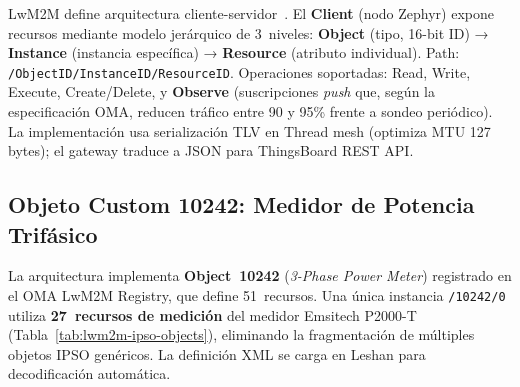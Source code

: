 LwM2M define arquitectura cliente-servidor~\cite{OMA_LwM2M2020}. El \textbf{Client} (nodo Zephyr) expone recursos mediante modelo jerárquico de 3~niveles: \textbf{Object} (tipo, 16-bit ID) → \textbf{Instance} (instancia específica) → \textbf{Resource} (atributo individual). Path: \texttt{/ObjectID/InstanceID/ResourceID}. Operaciones soportadas: Read, Write, Execute, Create/Delete, y \textbf{Observe} (suscripciones \emph{push} que, según la especificación OMA, reducen tráfico entre 90 y 95\% frente a sondeo periódico). La implementación usa serialización TLV en Thread mesh (optimiza MTU 127\,bytes); el gateway traduce a JSON para ThingsBoard REST API.

\subsection{Objeto Custom 10242: Medidor de Potencia Trifásico}
\label{sec:nodo-lwm2m-objetos}

La arquitectura implementa \textbf{Object~10242} (\emph{3-Phase Power Meter}) registrado en el OMA LwM2M Registry, que define 51~recursos. Una única instancia \texttt{/10242/0} utiliza \textbf{27~recursos de medición} del medidor Emsitech P2000-T (Tabla~\ref{tab:lwm2m-ipso-objects}), eliminando la fragmentación de múltiples objetos IPSO genéricos. La definición XML se carga en Leshan para decodificación automática.

